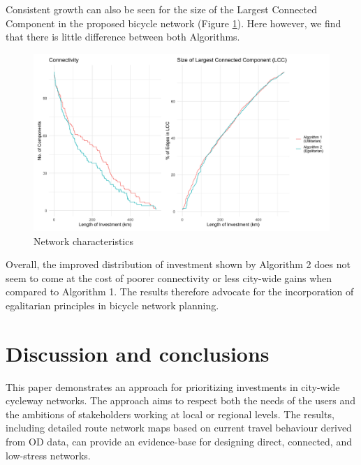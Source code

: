 \documentclass[
]{article}
\begin{document}
Consistent growth can also be seen for the size of the Largest Connected
Component in the proposed bicycle network (Figure
\ref{fig:componentsandGCC}). Here however, we find that there is little
difference between both Algorithms.

\begin{figure}[H]

{\centering \includegraphics[width=0.85\linewidth]{data/Manchester/Plots/Growth_Results/growth_util_egal_components_gcc_components_together_Manchester} 

}

\caption{Network characteristics}\label{fig:componentsandGCC}
\end{figure}

Overall, the improved distribution of investment shown by Algorithm 2 does not seem to come at the cost
of poorer connectivity or less city-wide gains when compared to Algorithm 1.
The results therefore advocate for the incorporation of egalitarian principles in bicycle network planning.

\hypertarget{discussion-and-conclusions}{%
\section{Discussion and conclusions}\label{discussion-and-conclusions}}

This paper demonstrates an approach for prioritizing
investments in city-wide cycleway networks. The approach aims to respect
both the needs of the users and the ambitions of stakeholders working at
local or regional levels. The results, including detailed route network
maps based on current travel behaviour derived from OD data, can provide
an evidence-base for designing direct, connected,
and low-stress networks.
\end{document}
